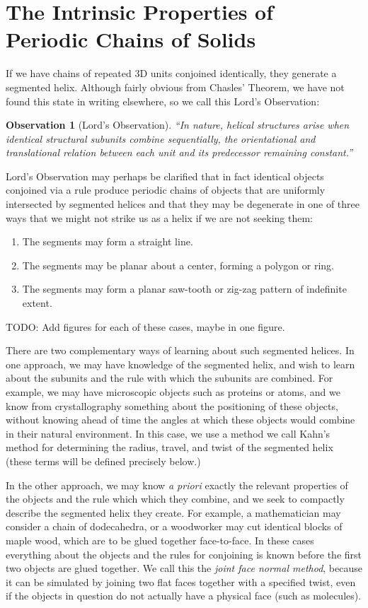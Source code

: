 \documentclass[11pt]{article}
\newtheorem{observation}{Observation}
\begin{document}
{\section{The Intrinsic Properties of Periodic Chains of Solids}

If we have chains of repeated 3D units conjoined identically, they generate a segmented helix.
Although fairly obvious from Chasles' Theorem, we have not found this state in writing elsewhere, so we call this Lord's Observation:

\begin{observation}[Lord's Observation]
  “In nature, helical structures arise when identical structural subunits combine sequentially, the orientational and translational relation between each unit and its predecessor remaining constant.”\cite{lord2002helical}
\end{observation}
Lord's Observation may perhaps be clarified that in fact identical objects conjoined via a rule
produce periodic chains of objects that are uniformly intersected by segmented helices and that they may be degenerate in one of
three ways that we might not strike us as a helix if we are not seeking them:
\begin{enumerate}
\item The segments may form a straight line.
\item The segments may be planar about a center, forming a polygon or ring.
\item The segments may form a planar saw-tooth or zig-zag pattern of indefinite extent.
\end{enumerate}

TODO: Add figures for each of these cases, maybe in one figure.

There are two complementary ways of learning about such segmented helices. In one approach, we may have knowledge of the segmented helix, and
wish to learn about the subunits and the rule with which the subunits are combined.
For example, we may have microscopic objects such as proteins
or atoms, and we know from crystallography something about the positioning of these objects, without
knowing ahead of time the angles at which these objects would combine in their natural environment.
In this case, we use a method we call Kahn's method\cite{kahn1989defining} for determining the radius, travel, and twist
of the segmented helix (these terms will be defined precisely below.)

In the other approach, we may know {\it a priori} exactly the
relevant properties of the objects and the rule which which they combine, and we seek to compactly describe the segmented helix they create.
For example, a mathematician may consider a chain of dodecahedra, or a woodworker may cut identical blocks of maple wood,
which are to be glued together face-to-face. In these cases everything about the objects and the rules for conjoining
is known before the first two objects are glued together. We call this the {\em joint face normal method}, because
it can be simulated by joining two flat faces together with a specified twist, even if the objects in question
do not actually have a physical face (such as molecules).

}
\end{document}
